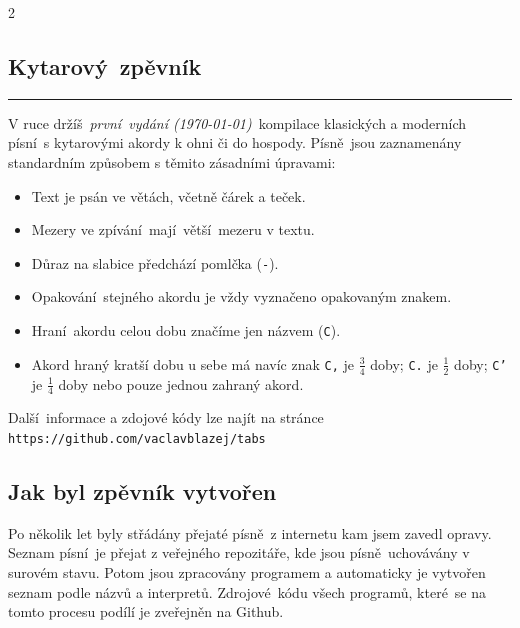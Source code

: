 \documentclass[a4paper,12pt]{article}
\begin{document}
\begin{multicols}{2}
    \subsection*{Kytarový zpěvník}
    \hrule\bigskip
    V ruce držíš \textit{první vydání (\today)} kompilace klasických a moderních písní s kytarovými akordy k ohni či do hospody.
    Písně jsou zaznamenány standardním způsobem 
    s těmito zásadními úpravami:
    \begin{itemize}
        \setlength\itemsep{-1mm}
        \item Text je psán ve větách, včetně čárek a teček.
        \item Mezery ve zpívání mají větší mezeru v textu.
        \item Důraz na slabice předchází pomlčka (\texttt{-}).
        \item Opakování stejného akordu je vždy vyznačeno opakovaným znakem.
        \item Hraní akordu celou dobu značíme jen názvem (\texttt{C}).
        \item Akord hraný kratší dobu u sebe má navíc znak \texttt{C,} je $\frac 34$ doby; \texttt{C.} je $\frac 12$ doby; \texttt{C'} je $\frac 14$ doby nebo pouze jednou zahraný akord.
    \end{itemize}

    Další informace a zdojové kódy lze najít na stránce \texttt{https://github.com/vaclavblazej/tabs}

    \subsection*{Jak byl zpěvník vytvořen}
    Po několik let byly střádány přejaté písně z internetu kam jsem zavedl opravy.
    Seznam písní je přejat z veřejného repozitáře, kde jsou písně uchovávány v surovém stavu.
    Potom jsou zpracovány programem a automaticky je vytvořen seznam podle názvů a interpretů.
    Zdrojové kódu všech programů, které se na tomto procesu podílí je zveřejněn na Github.
\end{multicols}
\newpage


\end{document}
